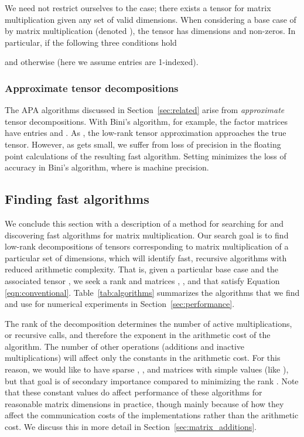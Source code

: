 \documentclass[preprint]{sigplanconf}
\begin{document}
We need not restrict ourselves to the  case; there exists a tensor for matrix multiplication given any set of valid dimensions.
When considering a base case of  by  matrix multiplication (denoted ),
the tensor has dimensions  and  non-zeros.
In particular,  if the following three conditions hold 

and otherwise  (here we assume entries are 1-indexed).

\subsubsection{Approximate tensor decompositions}
The APA algorithms discussed in Section~\ref{sec:related} arise from \emph{approximate} tensor decompositions.
With Bini's algorithm, for example, the factor matrices have entries  and .
As , the low-rank tensor approximation approaches the true tensor.
However, as  gets small, we suffer from loss of precision in the floating point calculations of the resulting fast algorithm.
Setting  minimizes the loss of accuracy in Bini's algorithm, where  is machine precision.







\subsection{Finding fast algorithms}
\label{sec:finding}

We conclude this section with a description of a method for searching for and discovering fast algorithms for matrix multiplication.
Our search goal is to find low-rank decompositions of tensors corresponding to matrix multiplication of a particular set of dimensions, which will identify fast, recursive algorithms with reduced arithmetic complexity. 
That is, given a particular base case  and the associated tensor , we seek a rank  and matrices , , and  that satisfy Equation \eqref{eqn:conventional}.
Table~\ref{tab:algorithms} summarizes the algorithms that we find and use for numerical experiments in Section~\ref{sec:performance}.

The rank of the decomposition determines the number of active multiplications, or recursive calls, and therefore the exponent in the arithmetic cost of the algorithm.
The number of other operations (additions and inactive multiplications) will affect only the constants in the arithmetic cost.
For this reason, we would like to have sparse , , and  matrices with simple values (like ), but that goal is of secondary importance compared to minimizing the rank .
Note that these constant values do affect performance of these algorithms for reasonable matrix dimensions in practice, though mainly because of how they affect the communication costs of the implementations rather than the arithmetic cost.
We discuss this in more detail in Section~\ref{sec:matrix_additions}.
\end{document}
